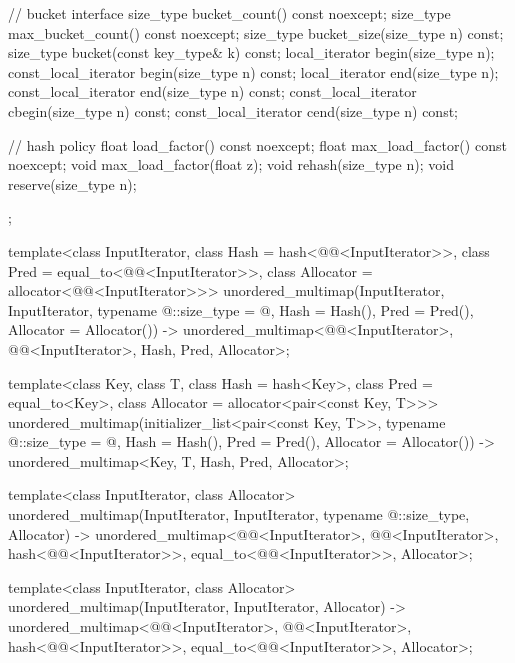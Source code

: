 \begin{codeblock}
{{    // bucket interface
    size_type bucket_count() const noexcept;
    size_type max_bucket_count() const noexcept;
    size_type bucket_size(size_type n) const;
    size_type bucket(const key_type& k) const;
    local_iterator begin(size_type n);
    const_local_iterator begin(size_type n) const;
    local_iterator end(size_type n);
    const_local_iterator end(size_type n) const;
    const_local_iterator cbegin(size_type n) const;
    const_local_iterator cend(size_type n) const;

    // hash policy
    float load_factor() const noexcept;
    float max_load_factor() const noexcept;
    void max_load_factor(float z);
    void rehash(size_type n);
    void reserve(size_type n);
  };

  template<class InputIterator,
           class Hash = hash<@@<InputIterator>>,
           class Pred = equal_to<@@<InputIterator>>,
           class Allocator = allocator<@@<InputIterator>>>
    unordered_multimap(InputIterator, InputIterator,
                       typename @\seebelow@::size_type = @\seebelow@,
                       Hash = Hash(), Pred = Pred(), Allocator = Allocator())
      -> unordered_multimap<@@<InputIterator>, @@<InputIterator>,
                            Hash, Pred, Allocator>;

  template<class Key, class T, class Hash = hash<Key>,
           class Pred = equal_to<Key>, class Allocator = allocator<pair<const Key, T>>>
    unordered_multimap(initializer_list<pair<const Key, T>>,
                       typename @\seebelow@::size_type = @\seebelow@,
                       Hash = Hash(), Pred = Pred(), Allocator = Allocator())
      -> unordered_multimap<Key, T, Hash, Pred, Allocator>;

  template<class InputIterator, class Allocator>
    unordered_multimap(InputIterator, InputIterator, typename @\seebelow@::size_type, Allocator)
      -> unordered_multimap<@@<InputIterator>, @@<InputIterator>,
                            hash<@@<InputIterator>>,
                            equal_to<@@<InputIterator>>, Allocator>;

  template<class InputIterator, class Allocator>
    unordered_multimap(InputIterator, InputIterator, Allocator)
      -> unordered_multimap<@@<InputIterator>, @@<InputIterator>,
                            hash<@@<InputIterator>>,
                            equal_to<@@<InputIterator>>, Allocator>;

}
\end{codeblock}
